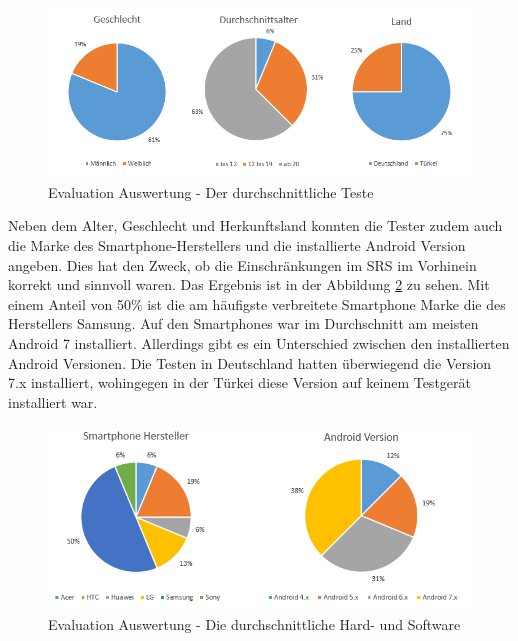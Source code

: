 				\begin{figure}[htbp]
					\centering 
					\label{auswertungTester}
					\includegraphics[width=\textwidth]{pics/TesterAuswertung.png}
					\caption{Evaluation Auswertung - Der durchschnittliche Teste}
				\end{figure}

				Neben dem Alter, Geschlecht und Herkunftsland konnten die Tester zudem auch die Marke des Smartphone-Herstellers und die installierte Android Version angeben. Dies hat den Zweck, ob die Einschränkungen im \ac{SRS} im Vorhinein korrekt und sinnvoll waren. Das Ergebnis ist in der Abbildung \ref{auswertungSmartphones} zu sehen. Mit einem Anteil von 50\% ist die am häufigste verbreitete Smartphone Marke die des Herstellers Samsung. Auf den Smartphones war im Durchschnitt am meisten Android 7 installiert. Allerdings gibt es ein Unterschied zwischen den installierten Android Versionen. Die Testen in Deutschland hatten überwiegend die Version 7.x installiert, wohingegen in der Türkei diese Version auf keinem Testgerät installiert war.

				\begin{figure}[htbp]
					\centering 
					\label{auswertungSmartphones}
					\includegraphics[width=\textwidth]{pics/SmartphoneAuswertung.png}
					\caption{Evaluation Auswertung - Die durchschnittliche Hard- und Software}
				\end{figure}

